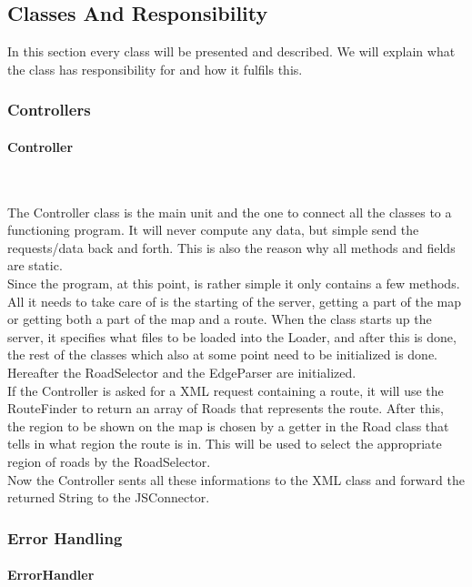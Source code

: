 \documentclass[a4paper,10pt,titlepage]{article}
\begin{document}
		\newpage
		\subsection{Classes And Responsibility}
		In this section every class will be presented and described. We will explain what the class has responsibility  for and how it fulfils this. 
			
			\subsubsection{Controllers}
			
				\paragraph{Controller}\mbox{}\
				
The Controller class is the main unit and the one to connect all the classes to a functioning program. It will never compute any data, but simple send the requests/data back and forth.  This is also the reason why all methods and fields are static.\\
Since the program, at this point, is rather simple it only contains a few methods. All it needs to take care of is the starting of the server, getting a part of the map or getting both a part of the map and a route. When the class starts up the server, it specifies what files to be loaded into the Loader, and after this is done, the rest of the classes which also at some point need to be initialized is done. Hereafter the RoadSelector and the EdgeParser are initialized.\\
If the Controller is asked for a XML request containing a route, it will use the RouteFinder to return an array of Roads that represents the route. After this, the region to be shown on the map is chosen by a getter in the Road class that tells in what region the route is in. This will be used to select the appropriate region of roads by the RoadSelector.\\
Now the Controller sents all these informations to the XML class and forward the returned String to the JSConnector.\\


					
			\subsubsection{Error Handling}
				
				\paragraph{ErrorHandler}\mbox{}\
\end{document}
